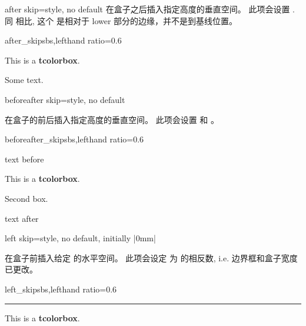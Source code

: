   \begin{docTcbKey}[][doc new and updated={2020-09-25}{2017-02-01}]{after skip}{=}{style, no default}
  在盒子之后插入指定高度的垂直空间。%
  此项会设置 .
  同  相比, %
  这个  是相对于 lower 部分的边缘，并不是到基线位置。%
  \begin{exdispExample*}{after_skip}{sbs,lefthand ratio=0.6}
  \begin{tcolorbox}[after skip=1cm,
      colframe=red!50!white]
    This is a \textbf{tcolorbox}.
  \end{tcolorbox}
  Some text.
  \end{exdispExample*}
  \end{docTcbKey}
  
  \begin{docTcbKey}[][doc new=2014-10-10]{beforeafter skip}{=}{style, no default}
  
  在盒子的前后插入指定高度的垂直空间。%
  此项会设置  和 。
  
  
    \begin{exdispExample*}{beforeafter_skip}{sbs,lefthand ratio=0.6}
  
  text before
  \begin{tcolorbox}
    This is a \textbf{tcolorbox}.
  \end{tcolorbox}
  \begin{tcolorbox}
    Second box.
  \end{tcolorbox}
  text after
  \end{exdispExample*}
  \end{docTcbKey}
 
  


\begin{docTcbKey}[][doc new=2014-11-07]{left skip}{=}{style, no default, initially |0mm|}
  
在盒子前插入给定  的水平空间。
此项会设定  为  的相反数,
  i.e. 边界框和盒子宽度已更改。
\begin{exdispExample*}{left_skip}{sbs,lefthand ratio=0.6}
\noindent\rule{\linewidth}{2pt}

\begin{tcolorbox}[left skip=1cm,
    colframe=red!50!white]
  This is a \textbf{tcolorbox}.
\end{tcolorbox}
\end{exdispExample*}
\end{docTcbKey}

